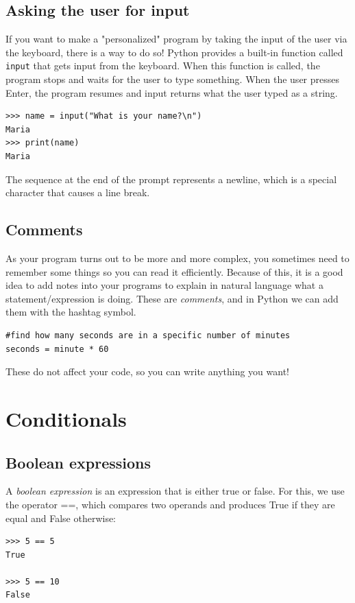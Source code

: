 \subsection{Asking the user for input}
If you want to make a "personalized" program by taking the input of the user via the keyboard, there is a way to do so! Python provides a built-in function called \texttt{input} that gets input from the keyboard. When this function is called, the program stops and waits for the user to type something. When the user presses Enter, the program resumes and input returns what the user typed as a string.
\begin{verbatim}
>>> name = input("What is your name?\n")
Maria
>>> print(name)
Maria
\end{verbatim}

The sequence at the end of the prompt represents a newline, which is a special character that causes a line break.

\subsection{Comments}
As your program turns out to be more and more complex, you sometimes need to remember some things so you can read it efficiently. Because of this, it is a good idea to add notes into your programs to explain in natural language what a statement/expression is doing. These are \textit{comments}, and in Python we can add them with the hashtag symbol.
\begin{verbatim}
#find how many seconds are in a specific number of minutes
seconds = minute * 60
\end{verbatim}

These do not affect your code, so you can write anything you want!

\section{Conditionals}
\subsection{Boolean expressions}
A \textit{boolean expression} is an expression that is either true or false. For this, we use the operator ==, which compares two operands and produces True if they are equal and False otherwise:
\begin{verbatim}
>>> 5 == 5
True
    
>>> 5 == 10
False
\end{verbatim}


